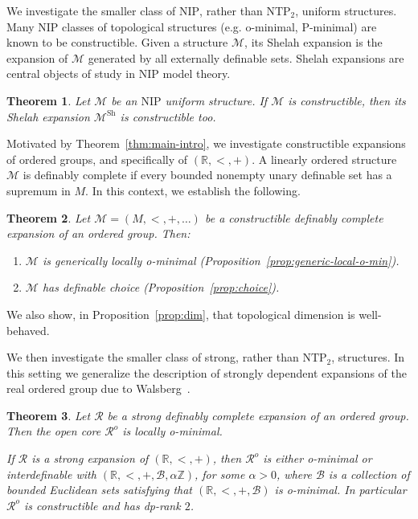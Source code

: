 \documentclass[12pt]{article}
\newcommand{\Bb}{\mathcal{B}}
\newcommand{\Mm}{\mathcal{M}}
\newcommand{\Rr}{\mathcal{R}}
\newcommand{\R}{\mathbb{R}}
\newcommand{\Z}{\mathbb{Z}}
\newcommand{\Msh}{\Mm^{\text{Sh}}}
\newcommand{\NIP}{\ensuremath{\mathrm{NIP}}}
\newcommand{\NTP}{\ensuremath{\mathrm{NTP}_2}}
\newcommand{\Ro}{\Rr^o}
\newtheorem{thmA}{Theorem}
\theoremstyle{definition}
\theoremstyle{remark}
\begin{document}
We investigate the smaller class of $\NIP$, rather than $\NTP$, uniform structures. Many $\NIP$ classes of topological structures (e.g. o-minimal, P-minimal) are known to be constructible. Given a structure $\Mm$, its Shelah expansion is the expansion of $\Mm$ generated by all externally definable sets. Shelah expansions are central objects of study in $\NIP$ model theory. %

\begin{thmA}\label{thm:nip-intro}
Let $\Mm$ be an $\NIP$ uniform structure. If $\Mm$ is constructible, then its Shelah expansion $\Msh$ is constructible too. 
\end{thmA}

Motivated by Theorem~\ref{thm:main-intro}, we investigate constructible expansions of ordered groups, and specifically of $(\R,<,+)$. A linearly ordered structure $\Mm$ is definably complete if every bounded nonempty unary definable set has a supremum in $M$. In this context, we establish the following.

\begin{thmA}\label{thm:cons-tame-top}
Let $\Mm=(M,<,+,\ldots)$ be a constructible definably complete expansion of an ordered group. Then:
\begin{enumerate}
    \item $\Mm$ is generically locally o-minimal (Proposition~\ref{prop:generic-local-o-min}).
    \item  $\Mm$ has definable choice (Proposition~\ref{prop:choice}).
\end{enumerate}
\end{thmA}

We also show, in Proposition~\ref{prop:dim}, that topological dimension is well-behaved. 

We then investigate the smaller class of strong, rather than $\NTP$, structures. In this setting we generalize the description of strongly dependent expansions of the real ordered group due to Walsberg~\cite{Wal22}. 

\begin{thmA}\label{thm:strong-intro}
Let $\Rr$ be a strong definably complete expansion of an ordered group. Then the open core $\Ro$ is locally o-minimal. 

If $\Rr$ is a strong expansion of $(\R,<,+)$, then $\Ro$ is either o-minimal or interdefinable with $(\R,<,+,\Bb, \alpha\Z)$, for some $\alpha>0$, where $\Bb$ is a collection of bounded Euclidean sets satisfying that $(\R,<,+,\Bb)$ is o-minimal. In particular $\Ro$ is constructible and has dp-rank $2$. 
\end{thmA}
\end{document}
